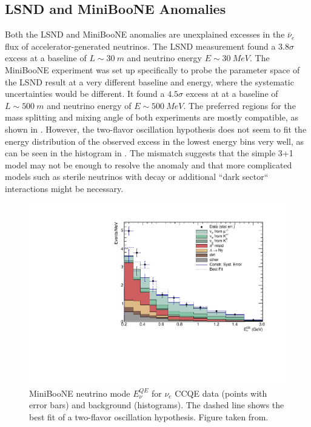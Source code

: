 \subsection{LSND and MiniBooNE Anomalies}
Both the LSND and MiniBooNE anomalies are unexplained excesses in the $\bar{\nu}_e$ flux of accelerator-generated neutrinos.
The LSND measurement found a $3.8\sigma$ excess at a baseline of  $L\sim\SI{30}{m}$ and neutrino energy $E\sim\SI{30}{MeV}$\cite{LSND:2001aii}.
The MiniBooNE experiment was set up specifically to probe the parameter space of the LSND result at a very different baseline and energy, where the systematic uncertainties would be different.
It found a $4.5\sigma$ excess at \cite{MiniBooNE:2018esg} at a baseline of $L\sim\SI{500}{m}$ and neutrino energy of $E\sim\SI{500}{MeV}$.
The preferred regions for the mass splitting and mixing angle of both experiments are mostly compatible, as shown in .
However, the two-flavor oscillation hypothesis does not seem to fit the energy distribution of the observed excess in the lowest energy bins very well, as can be seen in the histogram in .
The mismatch suggests that the simple 3+1 model may not be enough to resolve the anomaly and that more complicated models such as sterile neutrinos with decay\cite{Fischer_2020} or additional ``dark sector`` interactions\cite{PhysRevLett.121.241801} might be necessary.
\begin{figure}
    \centering
    \includegraphics[width=0.8\linewidth]{figures/theory/histNu_stacked_wbf.pdf}
    \caption{MiniBooNE neutrino mode $E^{QE}_\nu$ for $\nu_e$ CCQE data (points with error bars) and background (histograms). The dashed line shows the best fit of a two-flavor oscillation hypothesis. Figure taken from\cite{MiniBooNE:2018esg}.\label{fig:miniboone-excess-hist}}
\end{figure}

